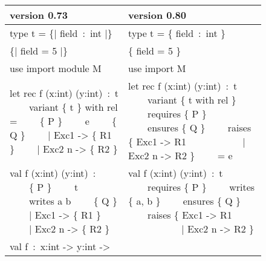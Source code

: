 \documentclass[a4paper,11pt,twoside,openright]{memoir}
\begin{document}
\begin{figure}[thbp]
  \centering
\begin{tabular}{|p{}|p{}|}
\hline
\textbf{version 0.73} & \textbf{version 0.80} \\
\hline
\ttfamily
type t = \{| field~:~int |\}
&
\ttfamily
type t = \{ field~:~int \}
\\
\hline
\ttfamily
\{| field = 5 |\}
&
\ttfamily
\{ field = 5 \}
\\
\hline
\ttfamily
use import module M
&
\ttfamily
use import M
\\
\hline
\ttfamily
let rec f (x:int) (y:int)~:~t \newline
\null~~~~variant \{ t \} with rel = \newline
\null~~~~\{ P \} \newline
\null~~~~e \newline
\null~~~~\{ Q \} \newline
\null~~~~| Exc1 -> \{ R1 \} \newline
\null~~~~| Exc2 n -> \{ R2 \}
&
\ttfamily
let rec f (x:int) (y:int)~:~t \newline
\null~~~~variant \{ t with rel \} \newline
\null~~~~requires \{ P \} \newline
\null~~~~ensures \{ Q \} \newline
\null~~~~raises \{ Exc1 -> R1 \newline
\null~~~~~~~~~~~| Exc2 n -> R2 \} \newline
\null~~~~= e
\\
\hline
\ttfamily
val f (x:int) (y:int)~:\newline
\null~~~~\{ P \} \newline
\null~~~~t \newline
\null~~~~writes a b \newline
\null~~~~\{ Q \} \newline
\null~~~~| Exc1 -> \{ R1 \} \newline
\null~~~~| Exc2 n -> \{ R2 \}
&
\ttfamily
val f (x:int) (y:int)~:~t \newline
\null~~~~requires \{ P \} \newline
\null~~~~writes \{ a, b \} \newline
\null~~~~ensures \{ Q \} \newline
\null~~~~raises \{ Exc1 -> R1 \newline
\null~~~~~~~~~~~| Exc2 n -> R2 \}
\\
\hline
\ttfamily
val f~:~x:int -> y:int ->\newline

\end{tabular}
\end{figure}
\end{document}
